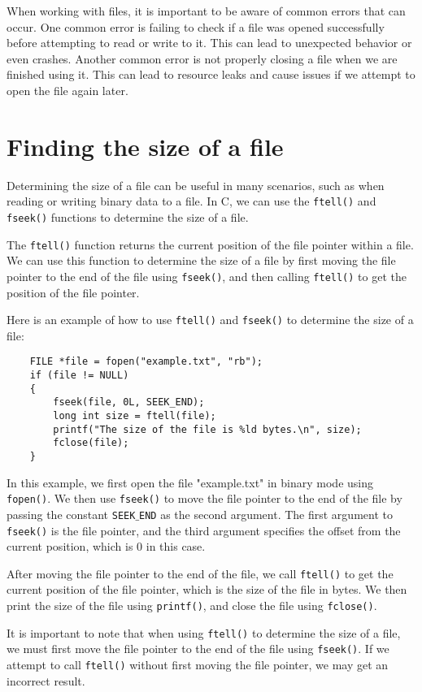 When working with files, it is important to be aware of common errors that can
occur. One common error is failing to check if a file was opened successfully
before attempting to read or write to it. This can lead to unexpected behavior
or even crashes. Another common error is not properly closing a file when we
are finished using it. This can lead to resource leaks and cause issues if we
attempt to open the file again later.

\section{Finding the size of a file}

Determining the size of a file can be useful in many scenarios, such as when reading or writing binary data to a file. In C, we can use the {\tt ftell()} and {\tt fseek()} functions to determine the size of a file.

The {\tt ftell()} function returns the current position of the file pointer within a file. We can use this function to determine the size of a file by first moving the file pointer to the end of the file using {\tt fseek()}, and then calling {\tt ftell()} to get the position of the file pointer.

Here is an example of how to use {\tt ftell()} and {\tt fseek()} to determine the size of a file:

\begin{verbatim}
	FILE *file = fopen("example.txt", "rb");
	if (file != NULL)
	{
		fseek(file, 0L, SEEK_END);
		long int size = ftell(file);
		printf("The size of the file is %ld bytes.\n", size);
		fclose(file);
	}
\end{verbatim}

In this example, we first open the file "example.txt" in binary mode using {\tt fopen()}. We then use {\tt fseek()} to move the file pointer to the end of the file by passing the constant {\tt SEEK$\_$END} as the second argument. The first argument to {\tt fseek()} is the file pointer, and the third argument specifies the offset from the current position, which is 0 in this case.

After moving the file pointer to the end of the file, we call {\tt ftell()} to get the current position of the file pointer, which is the size of the file in bytes. We then print the size of the file using {\tt printf()}, and close the file using {\tt fclose()}.

It is important to note that when using {\tt ftell()} to determine the size of a file, we must first move the file pointer to the end of the file using {\tt fseek()}. If we attempt to call {\tt ftell()} without first moving the file pointer, we may get an incorrect result.

